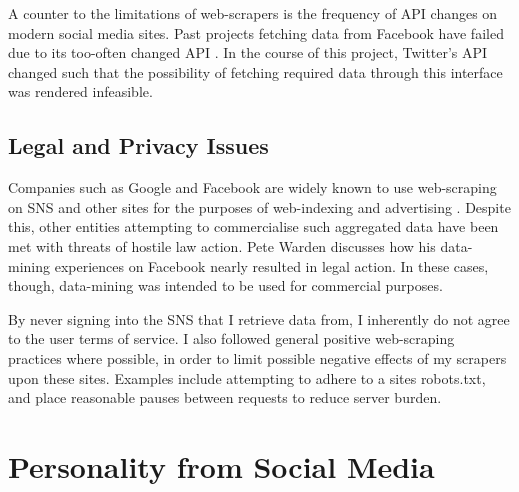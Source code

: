 
A counter to the limitations of web-scrapers is the frequency of API changes on modern social media sites. Past projects fetching data from Facebook have failed due to its too-often changed API \cite{}. In the course of this project, Twitter's API changed such that the possibility of fetching required data through this interface was rendered infeasible. 



\subsection{Legal and Privacy Issues}

Companies such as Google and Facebook are widely known to use web-scraping on SNS and other sites for the purposes of web-indexing and advertising \cite{}. Despite this, other entities attempting to commercialise such aggregated data have been met with threats of hostile law action. Pete Warden discusses how his data-mining experiences on Facebook nearly resulted in legal action. In these cases, though, data-mining was intended to be used for commercial purposes. 

By never signing into the SNS that I retrieve data from, I inherently do not agree to the user terms of service. I also followed general positive web-scraping practices where possible, in order to limit possible negative effects of my scrapers upon these sites. Examples include attempting to adhere to a sites robots.txt, and place reasonable pauses between requests to reduce server burden. 


\section{Personality from Social Media}

